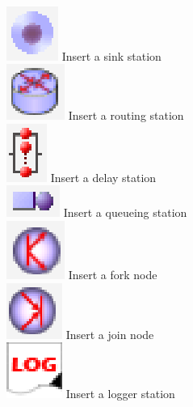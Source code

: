 \\
\includegraphics[scale=.5]{img/jsimg/insertSink} Insert a sink station\\
\includegraphics[scale=.5]{img/jsimg/insertRouter} Insert a routing
station\\
\includegraphics[scale=.5]{img/jsimg/insertDelay} Insert a delay station\\
\includegraphics[scale=.5]{img/jsimg/insertServer} Insert a queueing station\\
\includegraphics[scale=.5]{img/jsimg/insertFork} Insert a fork node\\
\includegraphics[scale=.5]{img/jsimg/insertJoin}  Insert a join node\\
\includegraphics[scale=.5]{img/jsimg/logger}  Insert a logger station\\
